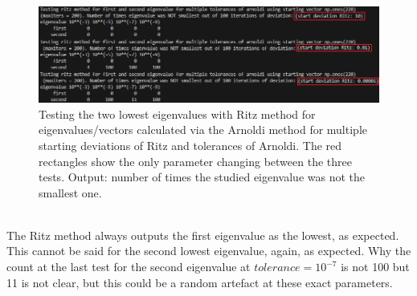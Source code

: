 \documentclass[11pt, letterpaper, onecolumn]{article}
\begin{document}
	\begin{figure} [H] 
	\begin{center}	
	\includegraphics[width=19cm]{"test_ritz-N220-dev0.01.png"}
	\caption{Testing the two lowest eigenvalues with Ritz method for eigenvalues/vectors calculated via the Arnoldi method for multiple starting deviations of Ritz and tolerances of Arnoldi. The red rectangles show the only parameter changing between the three tests. Output: number of times the studied eigenvalue was not the smallest one.} \label{fig:test_ritz}
	\end{center}
	\end{figure}
	\\
	The Ritz method always outputs the first eigenvalue as the lowest, as expected. This cannot be said for the second lowest eigenvalue, again, as expected. Why the count at the last test for the second eigenvalue at $tolerance=10^{-7}$ is not 100 but 11 is not clear, but this could be a random artefact at these exact parameters.
	
	
\end{document}

